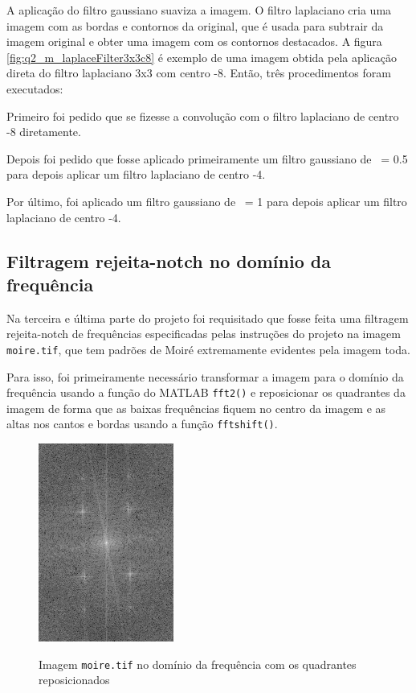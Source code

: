 \documentclass[conference]{IEEEtran}
\begin{document}
A aplicação do filtro gaussiano suaviza a imagem. O filtro laplaciano cria uma imagem com as bordas e contornos da original, que é usada para subtrair da imagem original e obter uma imagem com os contornos destacados. A figura \ref{fig:q2_m_laplaceFilter3x3c8} é exemplo de uma imagem obtida pela aplicação direta do filtro laplaciano 3x3 com centro -8. Então, três procedimentos foram executados:

Primeiro foi pedido que se fizesse a convolução com o filtro laplaciano de centro -8 diretamente.

Depois foi pedido que fosse aplicado primeiramente um filtro gaussiano de \textsigma\ = 0.5 para depois aplicar um filtro laplaciano de centro -4.

Por último, foi aplicado um filtro gaussiano de \textsigma\ = 1 para depois aplicar um filtro laplaciano de centro -4.


\subsection{Filtragem rejeita-notch no domínio da frequência}

Na terceira e última parte do projeto foi requisitado que fosse feita uma filtragem rejeita-notch de frequências especificadas pelas instruções do projeto na imagem \texttt{moire.tif}, que tem padrões de Moiré extremamente evidentes pela imagem toda.

Para isso, foi primeiramente necessário transformar a imagem para o domínio da frequência usando a função do MATLAB \texttt{fft2()} e reposicionar os quadrantes da imagem de forma que as baixas frequências fiquem no centro da imagem e as altas nos cantos e bordas usando a função \texttt{fftshift()}.

\begin{figure}
    \centering
    \includegraphics[]{imgs/Q3-2 Reject Notch original Fourier.png}
    \caption\scriptsize{Imagem \texttt{moire.tif} no domínio da frequência com os quadrantes reposicionados}
    \label{fig:q3_m_frequencyOriginal}
\end{figure}
\end{document}

